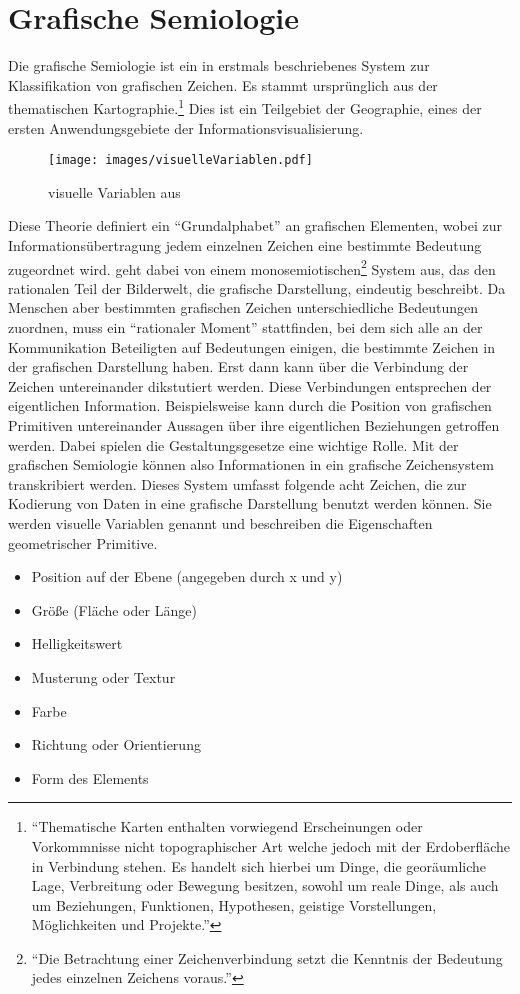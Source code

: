 \documentclass[a4paper, 12pt, DIVcalc, onepage, pdftex, headsepline, footsepline]{scrreprt}
\begin{document}
\section{Grafische Semiologie}
\label{sec:grafischeSemiologie}
Die grafische Semiologie ist ein in \citep{Bertin} erstmals beschriebenes System zur Klassifikation von grafischen Zeichen.
Es stammt ursprünglich aus der thematischen Kartographie.\footnote{"`Thematische Karten enthalten vorwiegend
Erscheinungen oder Vorkommnisse nicht topographischer Art welche jedoch mit der Erdoberfläche in Verbindung
stehen. Es handelt sich hierbei um Dinge, die georäumliche Lage, Verbreitung oder Bewegung besitzen, sowohl
um reale Dinge, als auch um Beziehungen, Funktionen, Hypothesen, geistige Vorstellungen, Möglichkeiten und
Projekte."'\citep{Gitta} } Dies ist ein Teilgebiet der Geographie, eines der ersten Anwendungsgebiete der
Informationsvisualisierung.
\begin{figure}
\centering
\texttt{[image: images/visuelleVariablen.pdf]}
\caption{visuelle Variablen aus \citep[S.\,51]{Bertin}}
\label{fig:visuelleVariablen}
\end{figure}
Diese Theorie definiert ein "`Grundalphabet"' an grafischen Elementen, wobei zur Informationsübertragung
jedem einzelnen Zeichen eine bestimmte Bedeutung zugeordnet wird. \citep{Bertin} geht dabei von einem
monosemiotischen\footnote{"`Die Betrachtung einer Zeichenverbindung setzt die Kenntnis der Bedeutung jedes
einzelnen Zeichens voraus."'\citep[S.\,3]{Bertin}} System aus, das den rationalen Teil der Bilderwelt, die
grafische Darstellung, eindeutig beschreibt.
Da Menschen aber bestimmten grafischen Zeichen unterschiedliche Bedeutungen zuordnen, muss ein "`rationaler Moment"'
stattfinden, bei dem sich alle an der Kommunikation Beteiligten auf Bedeutungen einigen,
die bestimmte Zeichen in der grafischen Darstellung haben. Erst dann kann über die Verbindung der Zeichen untereinander dikstutiert
werden. Diese Verbindungen entsprechen der eigentlichen Information. Beispielsweise kann
durch die Position von grafischen Primitiven untereinander Aussagen über ihre eigentlichen Beziehungen getroffen werden.
Dabei spielen die Gestaltungsgesetze eine wichtige Rolle.
Mit der grafischen Semiologie können also Informationen in ein grafische Zeichensystem
transkribiert werden. Dieses System umfasst folgende acht Zeichen, die zur Kodierung von Daten in eine grafische Darstellung benutzt
werden können. Sie werden visuelle Variablen genannt und beschreiben die Eigenschaften geometrischer Primitive.
\begin{itemize}
\item Position auf der Ebene (angegeben durch x und y)
\item Größe (Fläche oder Länge)
\item Helligkeitswert
\item Musterung oder Textur
\item Farbe
\item Richtung oder Orientierung
\item Form des Elements
\end{itemize}
\end{document}
